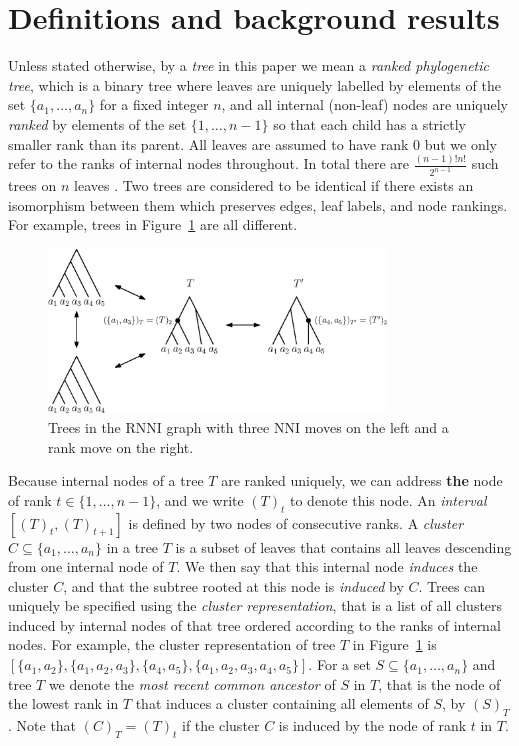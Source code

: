 \documentclass[11pt]{amsart}
\newcommand{\rnni}{\mathrm{RNNI}}
\newcommand{\nni}{\mathrm{NNI}}
\begin{document}
\section{Definitions and background results}

Unless stated otherwise, by a \emph{tree} in this paper we mean a \emph{ranked phylogenetic tree}, which is a binary tree where leaves are uniquely labelled by elements of the set $\{a_1, \ldots, a_n\}$ for a fixed integer $n$, and all internal (non-leaf) nodes are uniquely \emph{ranked} by elements of the set $\{1, \ldots, n-1\}$ so that each child has a strictly smaller rank than its parent.
All leaves are assumed to have rank $0$ but we only refer to the ranks of internal nodes throughout.
In total there are $\frac{(n - 1)! n!}{2^{n-1}}$ such trees on $n$ leaves \autocite{Gavryushkin2018-ol}.
Two trees are considered to be identical if there exists an isomorphism between them which preserves edges, leaf labels, and node rankings.
For example, trees in Figure~\ref{fig:ranked_trees_ex} are all different.

\begin{figure}[ht]
\centering
\includegraphics[width=0.8\textwidth]{ranked_trees_ex}
\caption{Trees in the $\rnni$ graph with three $\nni$ moves on the left and a rank move on the right.}
\label{fig:ranked_trees_ex}
\end{figure}

Because internal nodes of a tree $T$ are ranked uniquely, we can address \textbf{the} node of rank ${t \in \{1, \ldots, n - 1\}}$, and we write $(T)_t$ to denote this node.
An \emph{interval} $[(T)_t,(T)_{t+1}]$ is defined by two nodes of consecutive ranks.
A \emph{cluster} $C \subseteq \{a_1, \ldots, a_n\}$ in a tree $T$ is a subset of leaves that contains all leaves descending from one internal node of $T$.
We then say that this internal node \emph{induces} the cluster $C$, and that the subtree rooted at this node is \emph{induced} by $C$.
Trees can uniquely be specified using the \emph{cluster representation}, that is a list of all clusters induced by internal nodes of that tree ordered according to the ranks of internal nodes.
For example, the cluster representation of tree $T$ in Figure~\ref{fig:ranked_trees_ex} is $[\{a_1, a_2\}, \{a_1, a_2, a_3\}, \{a_4, a_5\}, \{a_1,a_2,a_3,a_4,a_5\}]$.
For a set $S \subseteq \{a_1, \ldots, a_n\}$ and tree $T$ we denote the \emph{most recent common ancestor} of $S$ in $T$, that is the node of the lowest rank in $T$ that induces a cluster containing all elements of $S$, by $(S)_T$.
Note that $(C)_T = (T)_t$ if the cluster $C$ is induced by the node of rank $t$ in $T$.
\end{document}
